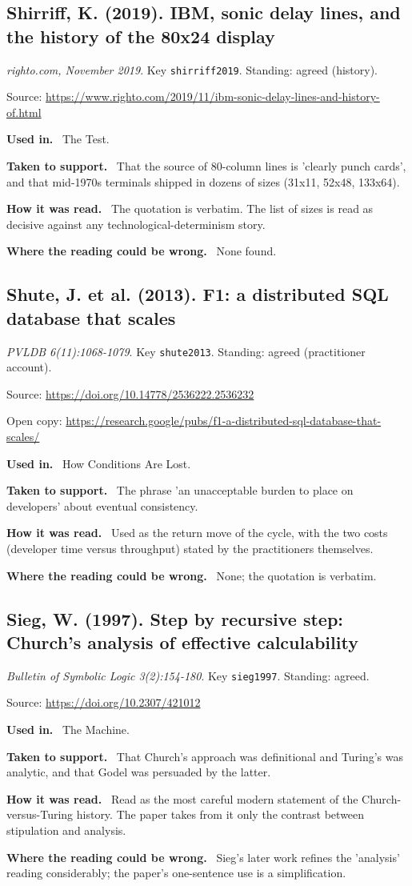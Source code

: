 \documentclass[11pt,oneside]{article}
\newcommand{\field}[1]{\par\noindent\textbf{\color{accent}#1.}\ }
\begin{document}
\hypertarget{src:shirriff2019}{}
\subsection*{Shirriff, K. (2019). IBM, sonic delay lines, and the history of the 80x24 display}
\noindent\small\emph{righto.com, November 2019}. Key \texttt{shirriff2019}. Standing: agreed (history).
\par\noindent\small Source: \url{https://www.righto.com/2019/11/ibm-sonic-delay-lines-and-history-of.html}
\normalsize
\field{Used in} The Test.
\field{Taken to support} That the source of 80-column lines is 'clearly punch cards', and that mid-1970s terminals shipped in dozens of sizes (31x11, 52x48, 133x64).
\field{How it was read} The quotation is verbatim. The list of sizes is read as decisive against any technological-determinism story.
\field{Where the reading could be wrong} None found.

\hypertarget{src:shute2013}{}
\subsection*{Shute, J. et al. (2013). F1: a distributed SQL database that scales}
\noindent\small\emph{PVLDB 6(11):1068-1079}. Key \texttt{shute2013}. Standing: agreed (practitioner account).
\par\noindent\small Source: \url{https://doi.org/10.14778/2536222.2536232}
\par\noindent\small Open copy: \url{https://research.google/pubs/f1-a-distributed-sql-database-that-scales/}
\normalsize
\field{Used in} How Conditions Are Lost.
\field{Taken to support} The phrase 'an unacceptable burden to place on developers' about eventual consistency.
\field{How it was read} Used as the return move of the cycle, with the two costs (developer time versus throughput) stated by the practitioners themselves.
\field{Where the reading could be wrong} None; the quotation is verbatim.

\hypertarget{src:sieg1997}{}
\subsection*{Sieg, W. (1997). Step by recursive step: Church's analysis of effective calculability}
\noindent\small\emph{Bulletin of Symbolic Logic 3(2):154-180}. Key \texttt{sieg1997}. Standing: agreed.
\par\noindent\small Source: \url{https://doi.org/10.2307/421012}
\normalsize
\field{Used in} The Machine.
\field{Taken to support} That Church's approach was definitional and Turing's was analytic, and that Godel was persuaded by the latter.
\field{How it was read} Read as the most careful modern statement of the Church-versus-Turing history. The paper takes from it only the contrast between stipulation and analysis.
\field{Where the reading could be wrong} Sieg's later work refines the 'analysis' reading considerably; the paper's one-sentence use is a simplification.
\end{document}
